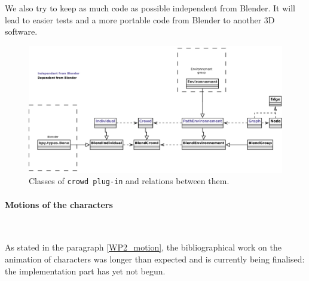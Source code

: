 We also try to keep as much code as possible independent from Blender. It will lead to easier tests and a more portable code from Blender to another 3D software.

\begin{figure}[h]
  \includegraphics[width=15cm]{crowd_final.pdf}
  \caption{Classes of \texttt{crowd plug-in} and relations between them.}
  \label{crowd_classes}
\end{figure}

\paragraph{Motions of the characters}~

As stated in the paragraph \ref{WP2_motion}, the bibliographical work on the animation of characters was longer than expected and is currently being finalised: the implementation part has yet not begun.



